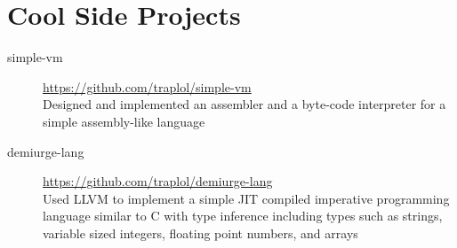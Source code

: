\documentclass[10pt]{article} %
\begin{document}
\section{Cool Side Projects}
\vspace{-3mm}

\begin{description}
\item[simple-vm]
{\footnotesize \href{https://github.com/traplol/simple-vm}{https://github.com/traplol/simple-vm}} \\
Designed and implemented an assembler and a byte-code interpreter for a simple assembly-like language

\item[demiurge-lang]
{\footnotesize \href{https://github.com/traplol/demiurge-lang}{https://github.com/traplol/demiurge-lang}} \\
Used LLVM to implement a simple JIT compiled imperative programming language similar to C with type inference including types such as strings, variable sized integers, floating point numbers, and arrays
\end{description}
\end{document}
